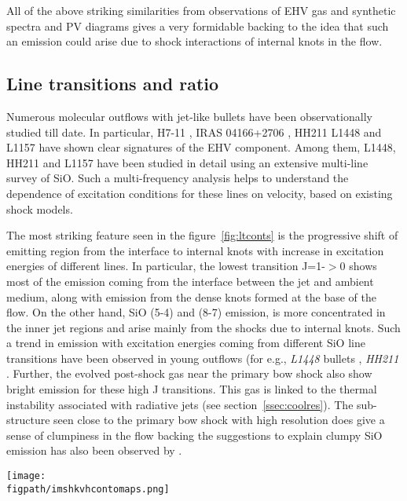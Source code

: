 \documentclass[useAMS,usenatbib]{mn2e}
\newcommand{\figpath}{/Users/bhargavvaidya/MyProject/work/Leeds_Uni/SiOJets_New/PAPER/PFIGS/}
\begin{document}
All of the above striking similarities from observations of EHV gas
and synthetic spectra and PV diagrams gives a very formidable backing
to the idea that such an emission could arise due to shock interactions of
internal knots in the flow. 

\subsection{Line transitions and ratio}
Numerous molecular outflows with jet-like bullets have been
observationally studied till date. In particular, H7-11
\citep{Bachiller:1998p14725}, IRAS 04166+2706
\citep{SantiagoGarcia:2009p13972, Tafalla:2010p14759}, HH211 \citep{Nisini:2002p14418}
L1448 \citep{Bachiller:1991p14732,Nisini:2007p13128,
  Tafalla:2010p14759} and L1157 \citep{Nisini:2007p13128} have
shown clear signatures of the EHV component. Among them, L1448, HH211 and
L1157 have been studied in detail using an extensive multi-line
survey of SiO. Such a multi-frequency analysis helps to understand the dependence of
excitation conditions for these lines on velocity, based on existing shock
models.  
%

The most striking feature seen in the figure~\ref{fig:ltconts} is the progressive shift of
emitting region from the interface to internal knots with increase in
excitation energies of different lines. In particular, the lowest
transition J=1-$>$0 shows most of the emission coming from the
interface between the jet and ambient medium, along with emission from
the dense knots formed at the base of the flow. On the other hand, SiO (5-4) and (8-7) emission, 
is more concentrated in the inner jet regions and arise mainly from
the shocks due to internal knots. Such a trend in emission with excitation energies coming from different SiO line transitions
have been observed in young outflows (for e.g., {\it{L1448}}
bullets \citep{Nisini:2007p13128}, {\it{HH211}}
\citep{Chandler:2001p14376, Nisini:2002p14418,
  Hirano:2006p14411}. Further, the evolved post-shock gas near the
primary bow shock also show bright emission for these high J transitions. 
This gas is linked to the thermal instability associated with
radiative jets (see section~\ref{ssec:coolres}). The sub-structure seen close to the
primary bow shock with high resolution does give a sense of clumpiness
in the flow backing the suggestions to explain clumpy SiO emission has
also been observed by \cite{Chandler:2001p14376}.
%

\begin{figure*}
 \texttt{[image: \\figpath/imshkvhcontomaps.png]}
 \caption{Symmetrical contour maps of multi-line integrated SiO
   emission convolved with a 2\arcsec beam obtained using parameters of the reference run. The contour colors represent different intenties in Kelvins, i.e,
   30.0({\it red}), 10.0({\it green}), 5.0({\it blue}), 1.0({\it
     magenta}), 0.5({\it cyan}), 0.1({\it black}).} 
\label{fig:ltconts}
\end{figure*}
\end{document}
